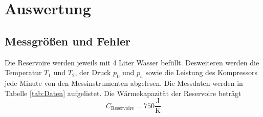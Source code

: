 \section{Auswertung}
\label{sec:Auswertung}
\subsection{Messgrößen und Fehler}
Die Reservoire werden jeweils mit 4 Liter Wasser befüllt. Desweiteren werden die Temperatur $T_\text{1}$ und $T_\text{2}$, der Druck $p_{\text{b}}$ und $p_{\text{a}}$ sowie die Leistung des Kompressors jede Minute von den Messinstrumenten abgelesen. Die Messdaten werden in Tabelle \ref{tab:Daten} aufgelistet. Die Wärmekapazität der Reservoire beträgt
\begin{equation}
  C_{\text{Reservoire}} = 750 \frac{\text{J}}{\text{K}}
  \label{eqn:c_re}
\end{equation}

